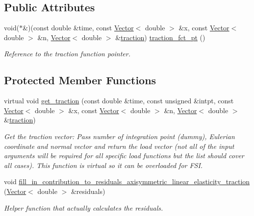 \subsection*{Public Attributes}
\begin{DoxyCompactItemize}
\item 
void($\ast$\&)(const double \&time, const \hyperlink{classoomph_1_1Vector}{Vector}$<$ double $>$ \&x, const \hyperlink{classoomph_1_1Vector}{Vector}$<$ double $>$ \&n, \hyperlink{classoomph_1_1Vector}{Vector}$<$ double $>$ \&\hyperlink{classoomph_1_1AxisymmetricLinearElasticityTractionElement_a28af87bac3d8d0c935564e69277e215e}{traction}) \hyperlink{classoomph_1_1AxisymmetricLinearElasticityTractionElement_a9c705a2b7379c63cc70c8e1e2aa6676d}{traction\+\_\+fct\+\_\+pt} ()
\begin{DoxyCompactList}\small\item\em Reference to the traction function pointer. \end{DoxyCompactList}\end{DoxyCompactItemize}
\subsection*{Protected Member Functions}
\begin{DoxyCompactItemize}
\item 
virtual void \hyperlink{classoomph_1_1AxisymmetricLinearElasticityTractionElement_a4ec6aee7438ab15aef197407e9c7ef8b}{get\+\_\+traction} (const double \&time, const unsigned \&intpt, const \hyperlink{classoomph_1_1Vector}{Vector}$<$ double $>$ \&x, const \hyperlink{classoomph_1_1Vector}{Vector}$<$ double $>$ \&n, \hyperlink{classoomph_1_1Vector}{Vector}$<$ double $>$ \&\hyperlink{classoomph_1_1AxisymmetricLinearElasticityTractionElement_a28af87bac3d8d0c935564e69277e215e}{traction})
\begin{DoxyCompactList}\small\item\em Get the traction vector\+: Pass number of integration point (dummy), Eulerian coordinate and normal vector and return the load vector (not all of the input arguments will be required for all specific load functions but the list should cover all cases). This function is virtual so it can be overloaded for F\+SI. \end{DoxyCompactList}\item 
void \hyperlink{classoomph_1_1AxisymmetricLinearElasticityTractionElement_aa263f7ced169d93b2e4fbb03738d059b}{fill\+\_\+in\+\_\+contribution\+\_\+to\+\_\+residuals\+\_\+axisymmetric\+\_\+linear\+\_\+elasticity\+\_\+traction} (\hyperlink{classoomph_1_1Vector}{Vector}$<$ double $>$ \&residuals)
\begin{DoxyCompactList}\small\item\em Helper function that actually calculates the residuals. \end{DoxyCompactList}\end{DoxyCompactItemize}
